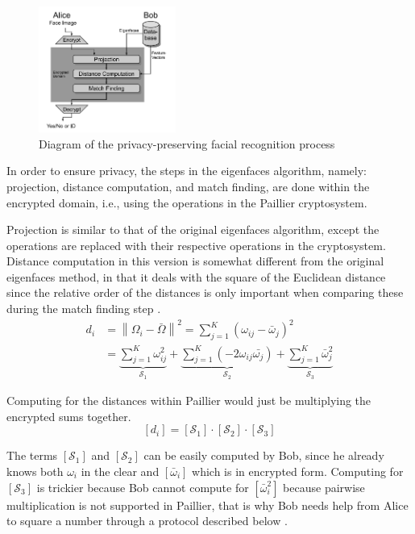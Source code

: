 \begin{figure}[!h]
    \centering
    \includegraphics[width=0.4\textwidth]{figures/secure_eigenfaces.png}
    \caption{Diagram of the privacy-preserving facial recognition process \cite{hutchison_privacy-preserving_2009}}
\end{figure}


In order to ensure privacy, the steps in the eigenfaces algorithm, namely: projection, distance computation, and match finding, are done within the encrypted domain, i.e., using the operations in the Paillier cryptosystem.

Projection is similar to that of the original eigenfaces algorithm, except the operations are replaced with their respective operations in the cryptosystem. Distance computation in this version is somewhat different from the original eigenfaces method, in that it deals with the square of the Euclidean distance since the relative order of the distances is only important when comparing these during the match finding step \cite{hutchison_privacy-preserving_2009}.
\begin{align}
    d_i &= \left\lVert \Omega_i - \bar{\Omega} \right\rVert ^2 = \sum_{j=1}^{K} \left(\omega_{ij} - \bar{\omega}_j\right)^2 \\
        &= \underbrace{\sum_{j=1}^{K} \omega_{ij}^2}_{\mathcal{S}_1} + \underbrace{\sum_{j=1}^{K} \left(-2 \omega_{ij} \bar{\omega_j}\right)}_{\mathcal{S}_2} + \underbrace{\sum_{j=1}^{K} \bar{\omega}_{j}^2}_{\mathcal{S}_3}
\end{align}

Computing for the distances within Paillier would just be multiplying the encrypted sums together.
\begin{equation}
	\left[d_i\right] = \left[\mathcal{S}_1\right] \cdot \left[\mathcal{S}_2\right] \cdot \left[\mathcal{S}_3\right]
\end{equation}

The terms $\left[\mathcal{S}_1\right]$ and $\left[\mathcal{S}_2\right]$ can be easily computed by Bob, since he already knows both $\omega_i$ in the clear and $\left[\bar{\omega}_i\right]$ which is in encrypted form. Computing for $\left[\mathcal{S}_3\right]$ is trickier because Bob cannot compute for $\left[\bar{\omega}_i^2\right]$ because pairwise multiplication is not supported in Paillier, that is why Bob needs help from Alice to square a number through a protocol described below \cite{hutchison_privacy-preserving_2009}.

